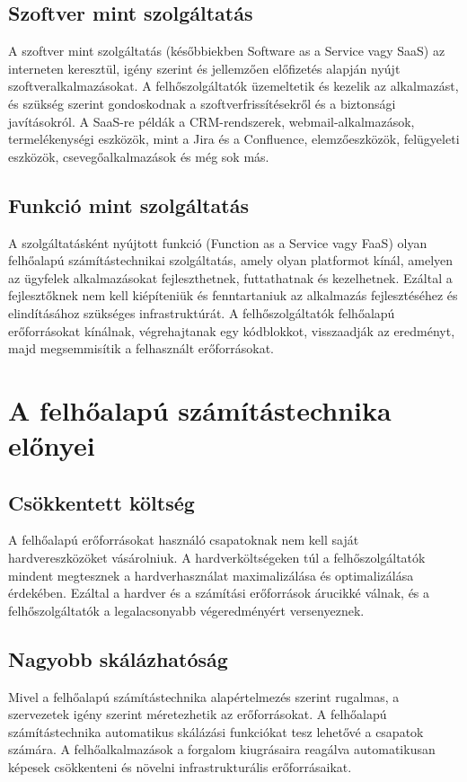 \subsection{Szoftver mint szolgáltatás}
A szoftver mint szolgáltatás (későbbiekben Software as a Service vagy SaaS) az interneten keresztül, igény szerint és jellemzően előfizetés alapján nyújt szoftveralkalmazásokat. A felhőszolgáltatók üzemeltetik és kezelik az alkalmazást, és szükség szerint gondoskodnak a szoftverfrissítésekről és a biztonsági javításokról. A SaaS-re példák a CRM-rendszerek, webmail-alkalmazások, termelékenységi eszközök, mint a Jira és a Confluence, elemzőeszközök, felügyeleti eszközök, csevegőalkalmazások és még sok más.
\cite{cloudComp}

\subsection{Funkció mint szolgáltatás}
A szolgáltatásként nyújtott funkció (Function as a Service vagy FaaS) olyan felhőalapú számítástechnikai szolgáltatás, amely olyan platformot kínál, amelyen az ügyfelek alkalmazásokat fejleszthetnek, futtathatnak és kezelhetnek. Ezáltal a fejlesztőknek nem kell kiépíteniük és fenntartaniuk az alkalmazás fejlesztéséhez és elindításához szükséges infrastruktúrát. A felhőszolgáltatók felhőalapú erőforrásokat kínálnak, végrehajtanak egy kódblokkot, visszaadják az eredményt, majd megsemmisítik a felhasznált erőforrásokat.
\cite{cloudComp}

\section{A felhőalapú számítástechnika előnyei}
\subsection*{Csökkentett költség}
A felhőalapú erőforrásokat használó csapatoknak nem kell saját hardvereszközöket vásárolniuk. A hardverköltségeken túl a felhőszolgáltatók mindent megtesznek a hardverhasználat maximalizálása és optimalizálása érdekében. Ezáltal a hardver és a számítási erőforrások árucikké válnak, és a felhőszolgáltatók a legalacsonyabb végeredményért versenyeznek.
\cite{cloudComp}

\subsection*{Nagyobb skálázhatóság}
Mivel a felhőalapú számítástechnika alapértelmezés szerint rugalmas, a szervezetek igény szerint méretezhetik az erőforrásokat. A felhőalapú számítástechnika automatikus skálázási funkciókat tesz lehetővé a csapatok számára. A felhőalkalmazások a forgalom kiugrásaira reagálva automatikusan képesek csökkenteni és növelni infrastrukturális erőforrásaikat.
\cite{cloudComp}

